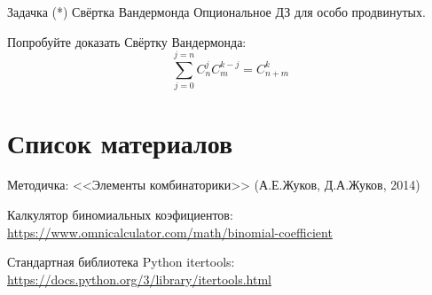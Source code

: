 \begin{frame}{Задачка (*) Свёртка Вандермонда}
Опциональное ДЗ для особо продвинутых.
	
Попробуйте доказать Свёртку Вандермонда:
\begin{equation}
\sum_{j=0}^{j=n} C_{n}^{j} C_{m}^{k-j} = C_{n+m}^{k}
\end{equation}


\end{frame}

\section{Список материалов}

\begin{frame}

Методичка: <<Элементы комбинаторики>> (А.Е.Жуков, Д.А.Жуков, 2014)

Калкулятор биномиальных коэфициентов: \url{https://www.omnicalculator.com/math/binomial-coefficient}

Стандартная библиотека Python itertools: \url{https://docs.python.org/3/library/itertools.html}

\end{frame}

  
